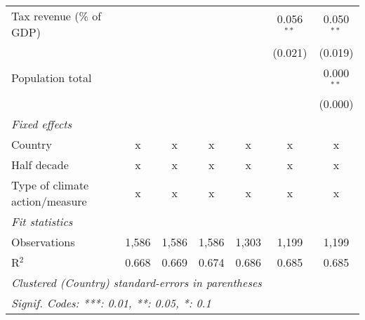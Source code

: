 \begin{tabular}{lcccccc}
   Tax revenue (\% of GDP)                        &         &         &                &                & 0.056$^{**}$   & 0.050$^{**}$\\   
                                                  &         &         &                &                & (0.021)        & (0.019)\\   
   Population total                               &         &         &                &                &                & 0.000$^{**}$\\   
                                                  &         &         &                &                &                & (0.000)\\   
   \emph{Fixed effects}\\
   Country                                        & x       & x       & x              & x              & x              & x\\  
   Half decade                                    & x       & x       & x              & x              & x              & x\\  
   Type of climate action/measure                 & x       & x       & x              & x              & x              & x\\  
   \midrule \emph{Fit statistics}\\
   Observations                                   & 1,586   & 1,586   & 1,586          & 1,303          & 1,199          & 1,199\\  
   R$^2$                                          & 0.668   & 0.669   & 0.674          & 0.686          & 0.685          & 0.685\\  
   \midrule
   \multicolumn{7}{l}{\emph{Clustered (Country) standard-errors in parentheses}}\\
   \multicolumn{7}{l}{\emph{Signif. Codes: ***: 0.01, **: 0.05, *: 0.1}}\\
\end{tabular}
\par\endgroup


